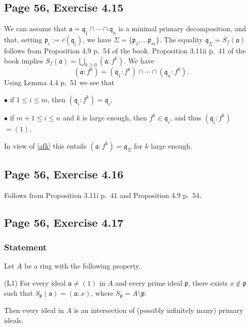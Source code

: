 \documentclass[parskip=half,fontsize=12pt]{scrartcl}%
\newcommand{\mf}{\mathfrak}
\newcommand{\aaa}{\mf a}
\newcommand{\ppp}{\mf p}
\newcommand{\qqq}{\mf q}
\newcommand{\bu}{\bullet}
\begin{document}
\subsection{Page 56, Exercise 4.15}%

We can assume that $\aaa=\qqq_1\cap\cdots\cap\qqq_n$ is a minimal primary decomposition, and that, setting $\ppp_i:=r(\qqq_i)$, we have $\Sigma=\{\ppp_1,\dots\ppp_m\}$. The equality $\qqq_\Sigma=S_f(\aaa)$ follows from Proposition 4.9 p.~54 of the book. Proposition 3.11ii p.~41 of the book implies $S_f(\aaa)=\bigcup_{k\ge0}(\aaa:f^k)$. We have 
\begin{equation}\label{afk}
(\aaa:f^k)=(\qqq_1:f^k)\cap\cdots\cap(\qqq_n:f^k).
\end{equation} 
Using Lemma 4.4 p.~51 we see that  

$\bu$ if $1\le i\le m$, then $(\qqq_i:f^k)=\qqq_i$,  

$\bu$ if $m+1\le i\le n$ and $k$ is large enough, then $f^k\in\qqq_i$, and thus $(\qqq_i:f^k)$ $=(1)$.

In view of \eqref{afk} this entails $(\aaa:f^k)=\qqq_\Sigma$ for $k$ large enough.

\subsection{Page 56, Exercise 4.16}%

Follows from Proposition 3.11i p.~41 and Proposition 4.9 p.~54.

\subsection{Page 56, Exercise 4.17}%

\subsubsection{Statement}\label{417}%

Let $A$ be a ring with the following property.

(L1) For every ideal $\mathfrak a\ne(1)$ in $A$ and every prime ideal $\mathfrak p$, there exists $x\notin\mathfrak p$ such that $S_{\mathfrak p}(\mathfrak a)=(\mathfrak a:x)$, where $S_{\mathfrak p}=A\setminus\mathfrak p$.

Then every ideal in $A$ is an intersection of (possibly infinitely many) primary ideals.
\end{document}
